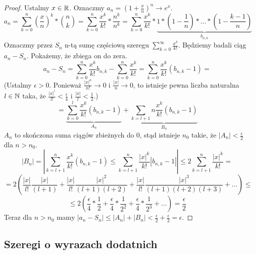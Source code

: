 \documentclass[9pt]{article}
\begin{document}
\begin{proof}
    Ustalmy $x \in \mathbb{R}$. Oznaczmy $a_n = \left(1+ \frac{x}{n}\right)^n \to e^x$.
    \[
        a_n = \sum_{k = 0}^n \left(\frac{x}{n}\right)^k * \binom{n}{k} =
        \sum_{k = 0}^n \frac{x^k}{k!} * \frac{n^{\underline{k}}}{n^k} =
        \sum_{k = 0}^n \frac{x^k}{k!} * 
        \underbrace{
            1 * \left(1 - \frac{1}{n}\right) * ... * \left(1- \frac{k-1}{n}\right)
        }_{b_{n, k}}
    \]
    Oznaczmy przez $S_n$ n-tą sumę częściową szeregu $\sum_{k = 0}^{\infty} \frac{x^k}{k!}$.
    Będziemy badali ciąg $a_n - S_n$. Pokażemy, że zbiega on do zera.
    \[
        a_n - S_n = \sum_{k = 0}^n \frac{x^k}{k!} b_{n, k} - \sum_{k = 0}^n \frac{x^k}{k!}
        =
        \sum_{k = 0}^n \frac{x^k}{k!} \left(b_{n, k} - 1\right)
        =
    \]
    (Ustalmy $\epsilon > 0$. Ponieważ $\frac{\left|x\right|^n}{n!} \to 0$ i
    $\frac{\left|x\right|}{n} \to 0$, to istnieje pewna liczba naturalna $l \in \mathbb{N}$ taka, że
    $\frac{|x|^l}{l!} < \frac{\epsilon}{4}$ i $\frac{|x|}{l} < \frac{1}{2}$.)
    \[
        =
        \underbrace{
            \sum_{k = 0}^l
            \frac{x^k}{k!} (b_{n, k} - 1)
        }_{A_n}
        +
        \underbrace{
            \sum_{k = l+1}n
            \frac{x^k}{k!} (b_{n, k} - 1)
        }_{B_n}
    \]
    $A_n$ to skończona suma ciągów zbieżnych do $0$, stąd istnieje $n_0$ takie, że $|A_n| <
    \frac{\epsilon}{2}$ dla $n > n_0$.
    \[
        |B_n| =
        \left|
        \sum_{k = l+1}^n \frac{x^k}{k!} (b_{n, k} - 1) \le
        \sum_{k = l+1}^n \frac{|x|^k}{k!} \left|b_{n,k} - 1\right|
        \right|
        \le
        2 \sum_{k = l+1}^n \frac{|x|^k}{k!}
        =
    \]
    \[
        =
        2 \left(
        \frac{|x|}{l!} \frac{|x|}{(l+1)} +
        \frac{|x|}{l!} \frac{|x|^2}{(l+1)(l+2)} +
        \frac{|x|}{l!} \frac{|x|^3}{(l+1)(l+2)(l+3)} + ...
        \right)
        \le
    \]
    \[
        \le
        2 \left(
            \frac{\epsilon}{4} * \frac{1}{2} +
            \frac{\epsilon}{4} * \frac{1}{2^2} +
            \frac{\epsilon}{4} * \frac{1}{2^3} + ...
        \right)
        = \frac{\epsilon}{2}
    \]
    Teraz dla $n > n_0$ mamy
    $\left|a_n - S_n\right| \le
    \left|A_n\right| + \left|B_n\right| < \frac{\epsilon}{2} + \frac{\epsilon}{2}
    = \epsilon$.
\end{proof}

\subsection{Szeregi o wyrazach dodatnich}
\end{document}

